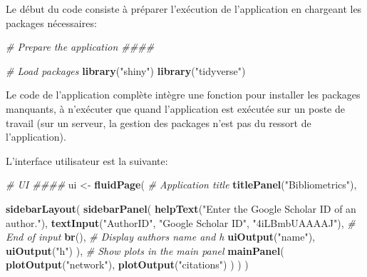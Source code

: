 \documentclass[
  12pt,
  french,
  a4paper,
  extrafontsizes,onecolumn,openright
  ]{memoir}
\newenvironment{Shaded}{\begin{snugshade}}{\end{snugshade}}
\newcommand{\CommentTok}[1]{\textcolor[rgb]{0.56,0.35,0.01}{\textit{#1}}}
\newcommand{\FunctionTok}[1]{\textcolor[rgb]{0.13,0.29,0.53}{\textbf{#1}}}
\newcommand{\NormalTok}[1]{#1}
\newcommand{\OtherTok}[1]{\textcolor[rgb]{0.56,0.35,0.01}{#1}}
\newcommand{\StringTok}[1]{\textcolor[rgb]{0.31,0.60,0.02}{#1}}
\newlength{\rf}
\begin{document}
Le début du code consiste à préparer l'exécution de l'application en chargeant les packages nécessaires:

\scriptsize

\begin{Shaded}
\begin{Highlighting}[]
\CommentTok{\# Prepare the application \#\#\#\#}

\CommentTok{\# Load packages}
\FunctionTok{library}\NormalTok{(}\StringTok{"shiny"}\NormalTok{)}
\FunctionTok{library}\NormalTok{(}\StringTok{"tidyverse"}\NormalTok{)}
\end{Highlighting}
\end{Shaded}

\normalsize

Le code de l'application complète intègre une fonction pour installer les packages manquants, à n'exécuter que quand l'application est exécutée sur un poste de travail (sur un serveur, la gestion des packages n'est pas du ressort de l'application).

L'interface utilisateur est la suivante:

\scriptsize

\begin{Shaded}
\begin{Highlighting}[]
\CommentTok{\# UI \#\#\#\#}
\NormalTok{ui }\OtherTok{\textless{}{-}} \FunctionTok{fluidPage}\NormalTok{(}
  \CommentTok{\# Application title}
  \FunctionTok{titlePanel}\NormalTok{(}\StringTok{"Bibliometrics"}\NormalTok{),}
  
  \FunctionTok{sidebarLayout}\NormalTok{(}
    \FunctionTok{sidebarPanel}\NormalTok{(}
      \FunctionTok{helpText}\NormalTok{(}\StringTok{"Enter the Google Scholar ID of an author."}\NormalTok{),}
      \FunctionTok{textInput}\NormalTok{(}\StringTok{"AuthorID"}\NormalTok{, }\StringTok{"Google Scholar ID"}\NormalTok{, }\StringTok{"4iLBmbUAAAAJ"}\NormalTok{),}
      \CommentTok{\# End of input}
      \FunctionTok{br}\NormalTok{(),}
      \CommentTok{\# Display author\textquotesingle{}s name and h}
      \FunctionTok{uiOutput}\NormalTok{(}\StringTok{"name"}\NormalTok{),}
      \FunctionTok{uiOutput}\NormalTok{(}\StringTok{"h"}\NormalTok{)}
\NormalTok{    ),}
    \CommentTok{\# Show plots in the main panel}
    \FunctionTok{mainPanel}\NormalTok{(}
      \FunctionTok{plotOutput}\NormalTok{(}\StringTok{"network"}\NormalTok{),}
      \FunctionTok{plotOutput}\NormalTok{(}\StringTok{"citations"}\NormalTok{)}
\NormalTok{    )}
\NormalTok{  )}
\NormalTok{)}
\end{Highlighting}
\end{Shaded}
\end{document}
